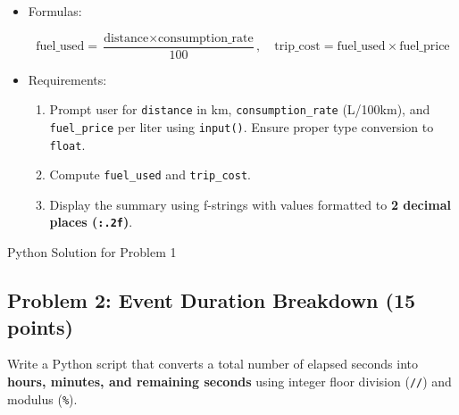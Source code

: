 \documentclass[11pt,a4paper]{article}
\begin{document}
\begin{itemize}[noitemsep]

  \item Formulas:

  $$\text{fuel\_used} = \frac{\text{distance} \times \text{consumption\_rate}}{100}, \quad \text{trip\_cost} = \text{fuel\_used} \times \text{fuel\_price}$$

  \item Requirements:

  \begin{enumerate}[noitemsep]

    \item Prompt user for \texttt{distance} in km, \texttt{consumption\_rate} (L/100km), and \texttt{fuel\_price} per liter using \texttt{input()}. Ensure proper type conversion to \texttt{float}.

    \item Compute \texttt{fuel\_used} and \texttt{trip\_cost}.

    \item Display the summary using f-strings with values formatted to \textbf{2 decimal places (\texttt{:.2f})}.

  \end{enumerate}

\end{itemize}

\begin{answerbox}[height=13.2cm]{Python Solution for Problem 1}

\vspace{0.03cm}

\end{answerbox}

\vspace{0.12cm}

\newpage

\subsection*{Problem 2: Event Duration Breakdown (15 points)}

Write a Python script that converts a total number of elapsed seconds into \textbf{hours, minutes, and remaining seconds} using integer floor division (\texttt{//}) and modulus (\texttt{\%}).
\end{document}
